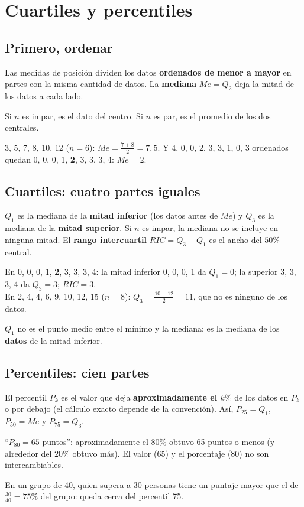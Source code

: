 \section{Cuartiles y percentiles}

\subsection{Primero, ordenar}
Las medidas de posición dividen los datos \textbf{ordenados de menor a mayor} en partes con la misma cantidad de datos. La \textbf{mediana} $Me = Q_2$ deja la mitad de los datos a cada lado.
\begin{clave}[Mediana] Si $n$ es impar, es el dato del centro. Si $n$ es par, es el promedio de los dos centrales.\end{clave}
\begin{ejemplo} 3, 5, 7, 8, 10, 12 ($n = 6$): $Me = \frac{7+8}{2} = 7{,}5$. Y 4, 0, 0, 2, 3, 3, 1, 0, 3 ordenados quedan 0, 0, 0, 1, \textbf{2}, 3, 3, 3, 4: $Me = 2$.\end{ejemplo}

\subsection{Cuartiles: cuatro partes iguales}
$Q_1$ es la mediana de la \textbf{mitad inferior} (los datos antes de $Me$) y $Q_3$ es la mediana de la \textbf{mitad superior}. Si $n$ es impar, la mediana no se incluye en ninguna mitad. El \textbf{rango intercuartil} $RIC = Q_3 - Q_1$ es el ancho del $50\%$ central.
\begin{ejemplo} En 0, 0, 0, 1, \textbf{2}, 3, 3, 3, 4: la mitad inferior 0, 0, 0, 1 da $Q_1 = 0$; la superior 3, 3, 3, 4 da $Q_3 = 3$; $RIC = 3$.\\
En 2, 4, 4, 6, 9, 10, 12, 15 ($n = 8$): $Q_3 = \frac{10+12}{2} = 11$, que no es ninguno de los datos.\end{ejemplo}
\begin{ojo} $Q_1$ no es el punto medio entre el mínimo y la mediana: es la mediana de los \textbf{datos} de la mitad inferior.\end{ojo}

\subsection{Percentiles: cien partes}
El percentil $P_k$ es el valor que deja \textbf{aproximadamente el $k\%$} de los datos en $P_k$ o por debajo (el cálculo exacto depende de la convención). Así, $P_{25} = Q_1$, $P_{50} = Me$ y $P_{75} = Q_3$.
\begin{clave}[Interpretar] ``$P_{80} = 65$ puntos'': aproximadamente el $80\%$ obtuvo 65 puntos o menos (y alrededor del $20\%$ obtuvo más). El valor (65) y el porcentaje (80) no son intercambiables.\end{clave}
\begin{ejemplo} En un grupo de 40, quien supera a 30 personas tiene un puntaje mayor que el de $\frac{30}{40} = 75\%$ del grupo: queda cerca del percentil 75.\end{ejemplo}


